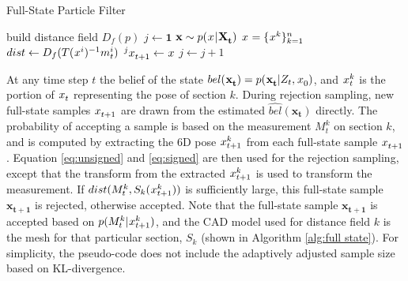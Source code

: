 \documentclass[../thesis.tex]{subfiles}
\begin{document}
\begin{algorithm}[t]
  \caption{Full-State Particle Filter}\label{alg:full state}
  \begin{algorithmic}[1]
    \State build distance field $D_f(p)$
    \State $j \gets \mathbf{1}$
    \State $\mathbf{x}\sim p(\particle|\mathbf{\particles[t]})$ \Comment $\particle = \{\particle[][][k]\}^n_{k=1}$
    \State $dist \gets D_f(T(\particle[][][i])^{-1}\measurement^i_t)$
    \State $\particle[t+1][j]\gets \particle$
    \State $j \gets j+1$
    \EndIf
    \EndWhile
  \end{algorithmic}
\end{algorithm}

At any time step $t$ the belief of the state $bel(\mathbf{\particle[t]}) = p(\mathbf{\particle[t]}| Z_t, \particle[0])$, and $\particle[t][][k]$ is the portion of $\particle[t]$ representing the pose of section $k$. 
During rejection sampling, new full-state samples $\particle[t+1]$ are drawn from the estimated $\hat{bel}(\mathbf{x_t})$ directly. 
The probability of accepting a sample is based on the measurement $M^k_t$ on section $k$, and is computed by extracting the 6D pose $\particle[t+1][][k]$ from each full-state sample $\particle[t+1]$. Equation \ref{eq:unsigned} and \ref{eq:signed} are then used for the rejection sampling, except that the transform from the extracted $\particle[t+1][][k]$ is used to transform the measurement. 
If $dist(M^k_t,S_k(\particle[t+1][][k]))$ is sufficiently large, this full-state sample $\mathbf{x_{t+1}}$ is rejected, otherwise accepted. 
Note that the full-state sample $\mathbf{x_{t+1}}$ is accepted based on $p(M^k_t|\particle[t+1][][k])$, and the CAD model used for distance field $k$ is the mesh for that particular section, $S_k$ (shown in Algorithm \ref{alg:full state}). For simplicity, the pseudo-code does not include the adaptively adjusted sample size based on KL-divergence\cite{Saund2017}\cite{Fox2003}. 

\end{document}
